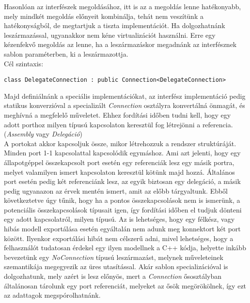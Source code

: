 \documentclass[a4paper,12pt]{report}
\begin{document}
Hasonlóan az interfészek megoldásához, itt is az a megoldás lenne hatékonyabb, mely mindkét megoldás előnyeit kombinálja, tehát nem veszítünk a hatékonyságból, de megtartjuk a tiszta implementációt. Ha dolgozhatnánk leszármazással, ugyanakkor nem kéne virtualizációt használni. Erre egy kézenfekvő megoldás az lenne, ha a leszármazáskor megadnánk az interfésznek sablon paraméterben, ki a leszármazottja. \\
Cél szintaxis:
\begin{lstlisting}
class DelegateConnection : public Connection<DelegateConnection>
\end{lstlisting}

Majd definiálnánk a speciális implementációkat, az interfész implementáció pedig statikus konverzióval a specializált \textit{Connection} osztályra konvertálná önmagát, és meghívná a megfelelő műveletet. Ehhez fordítási időben tudni kell, hogy egy adott porthoz milyen típusú kapcsolaton keresztül fog létrejönni a referencia. (\textit{Assembly} vagy \textit{Delegáció}) \\ 
A portokat akkor kapcsoljuk össze, mikor létrehozzuk a rendszer struktúráját. Minden port 1-1 kapcsolattal kapcsolódik egymáshoz. Ami azt jelenti, hogy egy állapotgéppel összekapcsolt port esetén egy referenciák lesz egy másik portra, melyet valamilyen ismert kapcsolaton keresztül kötünk majd hozzá. Általános port esetén pedig két referenciánk lesz, az egyik biztosan egy delegáció, a másik pedig ugyanazon az érvek mentén ismert, amit az előbb tárgyaltunk. Ebből következtetve úgy tűnik, hogy ha a pontos összekapcsolások nem is ismerünk, a potenciális összekapcsolások típusait igen, így fordítási időben el tudjuk dönteni egy adott kapcsolatról, milyen típusú. Az is lehetséges, hogy egy félkész, vagy hibás modell exportálása esetén egyáltalán nem adunk meg konnektort két port között. Ilyenkor exportálási hibát nem célszerű adni, mivel lehetséges, hogy a felhasználót tudatosan érdekel egy ilyen modellnek a C++ kódja, helyette inkább bevezetünk egy \textit{NoConnection} típusú leszármazást, melynek műveleteinek szemantikája megegyezik az üres utasítással. Akár sablon specializációval is dolgozhatunk, mely azért is lesz előnyös, mert a \textit{Connection} ősosztályban általánosan tárolunk egy port referenciát, melyeket az ősök megörökölnek, így ezt az adattagok megspórolhatnánk.
\end{document}

